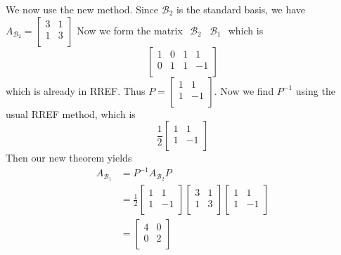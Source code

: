 \documentclass{article}
\begin{document}
\begin{example}
  We now use the new method. Since $\mathcal{B}_2$ is the standard basis, we have $A_{\mathcal{B}_2} =
    \begin{bmatrix}
      3 & 1 \\
      1 & 3 \\
    \end{bmatrix}$ Now we form the matrix $
    \begin{array}{c|c}
      \mathcal{B}_2 & \mathcal{B}_1
    \end{array}$ which is \[
    \left[
      \begin{array}{cc|cc}
        1 & 0 & 1 & 1  \\
        0 & 1 & 1 & -1 \\
      \end{array}\right]
  \] which is already in RREF. Thus $P =
    \begin{bmatrix}
      1 & 1  \\
      1 & -1 \\
    \end{bmatrix}$. Now we find $P^{-1}$ using the usual RREF method, which is \[
    \frac{1}{2}
    \begin{bmatrix}
      1 & 1  \\
      1 & -1 \\
    \end{bmatrix}
  \] Then our new theorem yields
  \begin{align*}
    A_{\mathcal{B}_1} & = P^{-1}A_{\mathcal{B}_2}P \\
                      & = \frac{1}{2}
    \begin{bmatrix}
      1 & 1  \\
      1 & -1 \\
    \end{bmatrix}
    \begin{bmatrix}
      3 & 1 \\
      1 & 3 \\
    \end{bmatrix}
    \begin{bmatrix}
      1 & 1  \\
      1 & -1 \\
    \end{bmatrix}                                 \\
                      & =
    \begin{bmatrix}
      4 & 0 \\
      0 & 2 \\
    \end{bmatrix}
  \end{align*}


\end{example}
\end{document}

